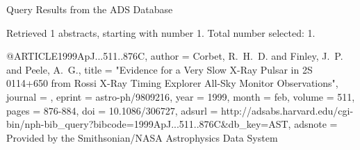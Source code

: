 Query Results from the ADS Database


Retrieved 1 abstracts, starting with number 1.  Total number selected: 1.

@ARTICLE{1999ApJ...511..876C,
   author = {{Corbet}, R.~H.~D. and {Finley}, J.~P. and {Peele}, A.~G.},
    title = "{Evidence for a Very Slow X-Ray Pulsar in 2S 0114+650 from Rossi X-Ray Timing Explorer All-Sky Monitor Observations}",
  journal = {\apj},
   eprint = {astro-ph/9809216},
     year = 1999,
    month = feb,
   volume = 511,
    pages = {876-884},
      doi = {10.1086/306727},
   adsurl = {http://adsabs.harvard.edu/cgi-bin/nph-bib_query?bibcode=1999ApJ...511..876C&db_key=AST},
  adsnote = {Provided by the Smithsonian/NASA Astrophysics Data System}
}


